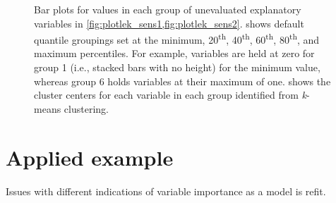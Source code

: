 \documentclass[article,shortnames]{jss}\usepackage[]{graphicx}\usepackage[]{color}
\begin{document}
\begin{figure}
\centering
{}

\caption{Bar plots for values in each group of unevaluated explanatory variables in \cref{fig:plotlek_sens1,fig:plotlek_sens2}.   shows default quantile groupings set at the minimum, 20\textsuperscript{th}, 40\textsuperscript{th}, 60\textsuperscript{th}, 80\textsuperscript{th}, and maximum percentiles.  For example, variables are held at zero for group 1 (i.e., stacked bars with no height) for the minimum value, whereas group 6 holds variables at their maximum of one.  shows the cluster centers for each variable in each group identified from {\it k}-means clustering.}
\label{fig:plotlek_bars}
\end{figure}

\section[Applied example]{Applied example}

Issues with different indications of variable importance as a model is refit.
\end{document}
